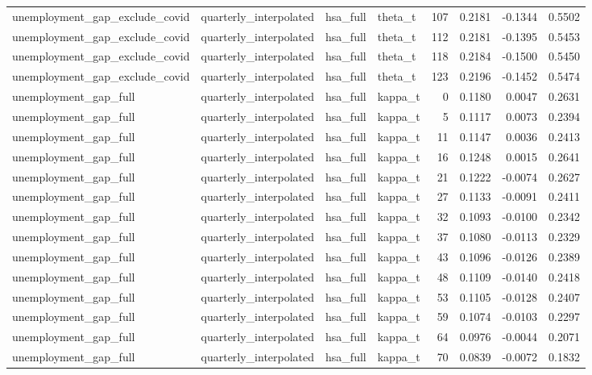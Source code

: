\begin{tabular}{llllrrrr}
unemployment\_gap\_exclude\_covid & quarterly\_interpolated & hsa\_full & theta\_t & 107 & 0.2181 & -0.1344 & 0.5502 \\
unemployment\_gap\_exclude\_covid & quarterly\_interpolated & hsa\_full & theta\_t & 112 & 0.2181 & -0.1395 & 0.5453 \\
unemployment\_gap\_exclude\_covid & quarterly\_interpolated & hsa\_full & theta\_t & 118 & 0.2184 & -0.1500 & 0.5450 \\
unemployment\_gap\_exclude\_covid & quarterly\_interpolated & hsa\_full & theta\_t & 123 & 0.2196 & -0.1452 & 0.5474 \\
unemployment\_gap\_full & quarterly\_interpolated & hsa\_full & kappa\_t & 0 & 0.1180 & 0.0047 & 0.2631 \\
unemployment\_gap\_full & quarterly\_interpolated & hsa\_full & kappa\_t & 5 & 0.1117 & 0.0073 & 0.2394 \\
unemployment\_gap\_full & quarterly\_interpolated & hsa\_full & kappa\_t & 11 & 0.1147 & 0.0036 & 0.2413 \\
unemployment\_gap\_full & quarterly\_interpolated & hsa\_full & kappa\_t & 16 & 0.1248 & 0.0015 & 0.2641 \\
unemployment\_gap\_full & quarterly\_interpolated & hsa\_full & kappa\_t & 21 & 0.1222 & -0.0074 & 0.2627 \\
unemployment\_gap\_full & quarterly\_interpolated & hsa\_full & kappa\_t & 27 & 0.1133 & -0.0091 & 0.2411 \\
unemployment\_gap\_full & quarterly\_interpolated & hsa\_full & kappa\_t & 32 & 0.1093 & -0.0100 & 0.2342 \\
unemployment\_gap\_full & quarterly\_interpolated & hsa\_full & kappa\_t & 37 & 0.1080 & -0.0113 & 0.2329 \\
unemployment\_gap\_full & quarterly\_interpolated & hsa\_full & kappa\_t & 43 & 0.1096 & -0.0126 & 0.2389 \\
unemployment\_gap\_full & quarterly\_interpolated & hsa\_full & kappa\_t & 48 & 0.1109 & -0.0140 & 0.2418 \\
unemployment\_gap\_full & quarterly\_interpolated & hsa\_full & kappa\_t & 53 & 0.1105 & -0.0128 & 0.2407 \\
unemployment\_gap\_full & quarterly\_interpolated & hsa\_full & kappa\_t & 59 & 0.1074 & -0.0103 & 0.2297 \\
unemployment\_gap\_full & quarterly\_interpolated & hsa\_full & kappa\_t & 64 & 0.0976 & -0.0044 & 0.2071 \\
unemployment\_gap\_full & quarterly\_interpolated & hsa\_full & kappa\_t & 70 & 0.0839 & -0.0072 & 0.1832 \\

\end{tabular}
